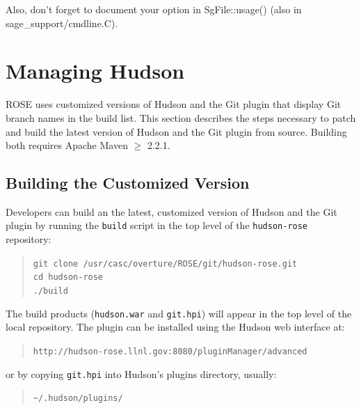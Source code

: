 Also, don't forget to document your option in SgFile::usage() (also in sage\_support/cmdline.C).


\section{Managing Hudson}
ROSE uses customized versions of Hudson and the Git plugin that display Git branch names
in the build list. This section describes the steps necessary to patch
and build the latest version of Hudson and the Git plugin from source.
Building both requires Apache Maven $\geq$ 2.2.1. 

\subsection{Building the Customized Version}
Developers can build an the latest, customized version of Hudson and the
Git plugin by running the \texttt{build} script in the top level of the
\texttt{hudson-rose} repository:
\begin{quote}\texttt{git clone /usr/casc/overture/ROSE/git/hudson-rose.git \\
  cd hudson-rose \\
  ./build \\
}
\end{quote}
The build products (\texttt{hudson.war} and \texttt{git.hpi}) will
appear in the top level of the local repository. The plugin can be installed
using the Hudson web interface at:
\begin{quote}\texttt{http://hudson-rose.llnl.gov:8080/pluginManager/advanced}\end{quote}
or by copying \texttt{git.hpi} into Hudson's plugins directory, usually:
\begin{quote}\texttt{\~{}/.hudson/plugins/}\end{quote}

